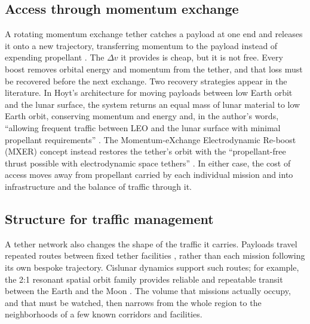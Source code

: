 \documentclass[11pt]{article}
\newcommand{\dv}{\ensuremath{\Delta v}}
\begin{document}
\subsection{Access through momentum exchange}

A rotating momentum exchange tether catches a payload at one end and releases it onto a new trajectory, transferring momentum to the payload instead of expending propellant \parencite{HoytUphoff2000,CartmellMcKenzie2008}.
The \dv{} it provides is cheap, but it is not free.
Every boost removes orbital energy and momentum from the tether, and that loss must be recovered before the next exchange.
Two recovery strategies appear in the literature.
In Hoyt's architecture for moving payloads between low Earth orbit and the lunar surface, the system returns an equal mass of lunar material to low Earth orbit, conserving momentum and energy and, in the author's words, ``allowing frequent traffic between LEO and the lunar surface with minimal propellant requirements'' \parencite{Hoyt1998ISSLunar}.
The Momentum-eXchange Electrodynamic Re-boost (MXER) concept instead restores the tether's orbit with the ``propellant-free thrust possible with electrodynamic space tethers'' \parencite{CanfieldSorensen2006}.
In either case, the cost of access moves away from propellant carried by each individual mission and into infrastructure and the balance of traffic through it.

\subsection{Structure for traffic management}

A tether network also changes the shape of the traffic it carries.
Payloads travel repeated routes between fixed tether facilities \parencite{Hoyt1999NIAC}, rather than each mission following its own bespoke trajectory.
Cislunar dynamics support such routes; for example, the 2:1 resonant spatial orbit family provides reliable and repeatable transit between the Earth and the Moon \parencite{BinderArnas2024}.
The volume that missions actually occupy, and that must be watched, then narrows from the whole region to the neighborhoods of a few known corridors and facilities.
\end{document}
